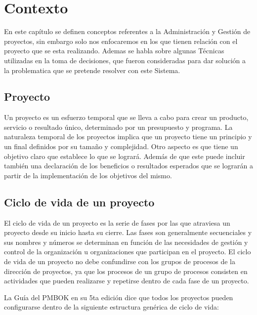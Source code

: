\chapter{Contexto}
\label{cap:reqUsr}

	En este capítulo se definen conceptos referentes a la Administración y Gestión de proyectos, sin embargo solo nos enfocaremos en los que tienen relación con el proyecto que se esta realizando. Ademas se habla sobre algunas Técnicas utilizadas en la toma de decisiones, que fueron consideradas para dar solución a la problematica que se pretende resolver con este Sistema.
\section{Proyecto}	
Un proyecto es un esfuerzo temporal que se lleva a cabo para crear un producto, servicio o resultado único, determinado por un presupuesto y programa. La naturaleza temporal de los proyectos implica que un proyecto tiene un principio y un final definidos por su tamaño y complejidad. Otro aspecto es que tiene un objetivo claro que establece lo que se logrará. Además de que este puede incluir también una declaración de los beneficios o resultados esperados que se lograrán a partir de la implementación de los objetivos del mismo.\cite{J. Gido P.}
\section{Ciclo de vida de un proyecto }	
El ciclo de vida de un proyecto es la serie de fases por las que atraviesa un proyecto desde su inicio hasta su cierre. Las fases son generalmente secuenciales y sus nombres y números se determinan en función de las necesidades de gestión y control de la organización u organizaciones que participan en el proyecto. El ciclo de vida de un proyecto no debe confundirse con los grupos de procesos de la dirección de proyectos, ya que los procesos de un grupo de procesos consisten en actividades que pueden realizarse y repetirse dentro de cada fase de un proyecto.\cite{PMBOK}  

La Guía del PMBOK en su 5ta edición dice que todos los proyectos pueden configurarse dentro de la siguiente estructura genérica de ciclo de vida:

